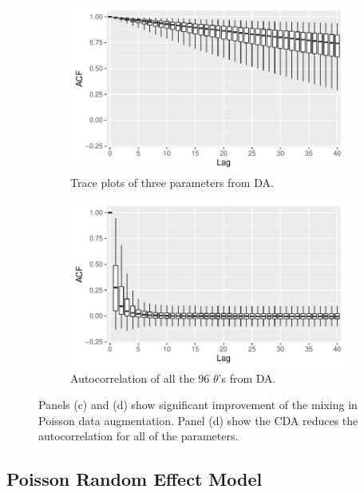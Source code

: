 \documentclass[10pt]{article}
\begin{document}
 \begin{figure}[H]
   \begin{subfigure}[b]{0.45\textwidth}
 \includegraphics[width=1\textwidth]{binomial_random_acf_da.pdf}
 \caption{Trace plots of three parameters from DA.}
 \end{subfigure}
  \hfill 
 \begin{subfigure}[b]{0.45\textwidth}
 \includegraphics[width=1\textwidth]{binomial_random_acf_cda.pdf}
 \caption{Autocorrelation of all the 96 $\theta$'s from DA.}
 \end{subfigure} 
 \caption{Panels (c) and (d) show significant improvement of the mixing in Poisson data augmentation. Panel (d) show the CDA reduces the autocorrelation for all of the parameters.}
 \label{data_binomial}
 \end{figure}


\subsection{Poisson Random Effect Model}
\end{document}
